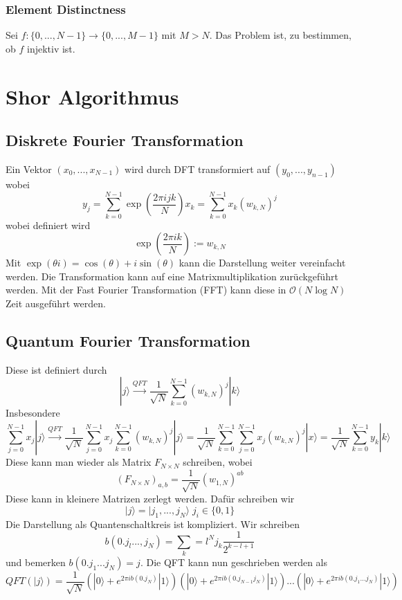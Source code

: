 \documentclass[a4paper, 12pt]{article}
\theoremstyle{plain}
\theoremstyle{definition}
\theoremstyle{lemma}
\theoremstyle{remark}
\theoremstyle{example}
\begin{document}
	\subsubsection{Element Distinctness}
	Sei $f: \{0,...,N-1\} \to \{0,...,M-1\}$ mit $M>N$. Das Problem ist, zu bestimmen, ob $f$ injektiv ist.
	\section{Shor Algorithmus}
	\subsection{Diskrete Fourier Transformation}
	Ein Vektor $(x_0,...,x_{N-1})$ wird durch DFT transformiert auf $(y_0,...,y_{n-1})$ wobei \[y_j = \sum_{k=0}^{N-1} \exp\left(\frac{2\pi ijk}{N}\right)x_k = \sum_{k=0}^{N-1} x_k(w_{k,N})^j\] wobei definiert wird \[\exp\left(\frac{2\pi ik}{N}\right):= w_{k,N}\]
	Mit $\exp\left(\theta i\right) = \cos(\theta) + i \sin(\theta)$ kann die Darstellung weiter vereinfacht werden. Die Transformation kann auf eine Matrixmultiplikation zurückgeführt werden. Mit der Fast Fourier Transformation (FFT) kann diese in $\mathcal{O}(N\log N)$ Zeit ausgeführt werden.
	\subsection{Quantum Fourier Transformation}
	Diese ist definiert durch \[|j\rangle \overset{QFT}{\to} \frac{1}{\sqrt{N}}\sum_{k=0}^{N-1}(w_{k,N})^j|k\rangle\] Insbesondere \[\sum_{j=0}^{N-1} x_j|j\rangle \overset{QFT}{\to} \frac{1}{\sqrt{N}} \sum_{j=0}^{N-1}x_j\sum_{k=0}^{N-1} (w_{k,N})^j|j\rangle = \frac{1}{\sqrt{N}}\sum_{k=0}^{N-1}\sum_{j=0}^{N-1}x_j(w_{k,N})^j|x\rangle = \frac{1}{\sqrt{N}} \sum_{k=0}^{N-1} y_k |k\rangle\]
	Diese kann man wieder als Matrix $F_{N\times N}$ schreiben, wobei \[(F_{N\times N})_{a,b} = \frac{1}{\sqrt{N}}(w_{1,N})^{ab}\]
	Diese kann in kleinere Matrizen zerlegt werden. Dafür schreiben wir \[|j\rangle = |j_1,...,j_N\rangle \; j_i \in \{0,1\}\]
	Die Darstellung als Quantenschaltkreis ist kompliziert. Wir schreiben \[b(0.j_l...,j_N) = \sum_k=l^{N}j_k\frac{1}{2^{k-l+1}}\] und bemerken $b(0.j_1...j_N) = j$. Die QFT kann nun geschrieben werden als \[QFT(|j\rangle) = \frac{1}{\sqrt{N}}(|0\rangle + e^{2\pi i b(0.j_N)}|1\rangle)(|0\rangle + e^{2\pi i b(0.j_{N-1}j_N)}|1\rangle) ... (|0\rangle + e^{2\pi i b(0.j_1...j_N)}|1\rangle)\]
\end{document}
